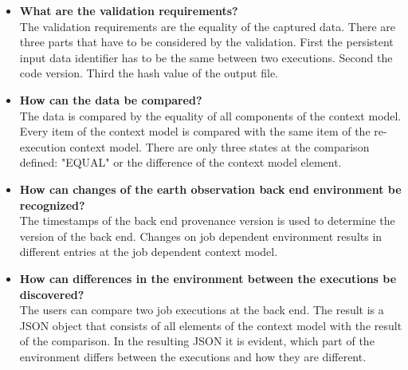 \documentclass[draft,final]{vutinfth} %
\begin{document}
\begin{itemize}
	\begin{itemize}
		\item \textbf{What are the validation requirements?} \\
		The validation requirements are the equality of the captured data. There are three parts that have to be considered by the validation. First the persistent input data identifier has to be the same between two executions. Second the code version. Third the hash value of the output file.
		\item \textbf{How can the data be compared?} \\
		The data is compared by the equality of all components of the context model. Every item of the context model is compared with the same item of the re-execution context model. There are only three states at the comparison defined: "EQUAL" or the difference of the context model element.
		\item \textbf{How can changes of the earth observation back end environment be recognized?} \\
		The timestamps of the back end provenance version is used to determine the version of the back end. Changes on job dependent environment results in different entries at the job dependent context model.  
		\item \textbf{How can differences in the environment between the executions be discovered?} \\
		The users can compare two job executions at the back end. The result is a JSON object that consists of all elements of the context model with the result of the comparison. In the resulting JSON it is evident, which part of the environment differs between the executions and how they are different.  
	\end{itemize}
\end{itemize}
\end{document}
